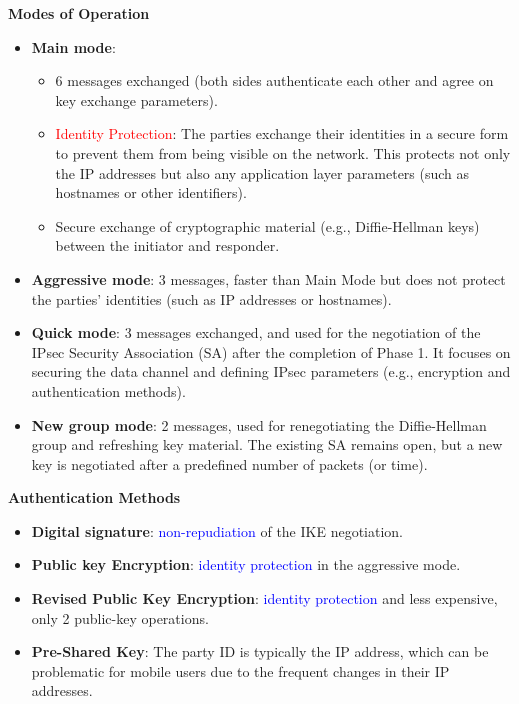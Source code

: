 \hfill 

\textbf{Modes of Operation}

\hfill

\begin{itemize}
    \item \textbf{Main mode}:
    \begin{itemize}
        \item 6 messages exchanged (both sides authenticate each other and agree on key exchange parameters).
        \item \textcolor{red}{Identity Protection}: The parties exchange their identities in a secure form to prevent them from being visible on the network. This protects not only the IP addresses but also any application layer parameters (such as hostnames or other identifiers).
        \item Secure exchange of cryptographic material (e.g., Diffie-Hellman keys) between the initiator and responder.
    \end{itemize}
    \item \textbf{Aggressive mode}: 3 messages, faster than Main Mode but does not protect the parties' identities (such as IP addresses or hostnames). 
    \item \textbf{Quick mode}: 3 messages exchanged, and used for the negotiation of the IPsec Security Association (SA) after the completion of Phase 1. It focuses on securing the data channel and defining IPsec parameters (e.g., encryption and authentication methods).
    \item \textbf{New group mode}: 2 messages, used for renegotiating the Diffie-Hellman group and refreshing key material. The existing SA remains open, but a new key is negotiated after a predefined number of packets (or time).
\end{itemize}

\hfill

\textbf{Authentication Methods}

\hfill

\begin{itemize}
    \item \textbf{Digital signature}: \textcolor{Blue}{non-repudiation} of the IKE negotiation.
    \item \textbf{Public key Encryption}: \textcolor{Blue}{identity protection} in the aggressive mode.
    \item \textbf{Revised Public Key Encryption}: \textcolor{Blue}{identity protection} and less expensive, only 2 public-key operations.
    \item \textbf{Pre-Shared Key}: The party ID is typically the IP address, which can be problematic for mobile users due to the frequent changes in their IP addresses.
\end{itemize}

